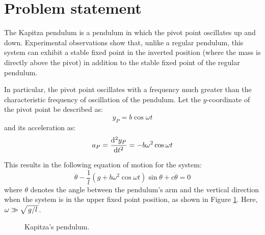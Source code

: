 \section{Problem statement}

The Kapitza pendulum is a pendulum in which the pivot point oscillates up and down. Experimental observations show that, unlike a regular pendulum, this system can exhibit a stable fixed point in the inverted position (where the mass is directly above the pivot) in addition to the stable fixed point of the regular pendulum.

In particular, the pivot point oscillates with a frequency much greater than the characteristic frequency of oscillation of the pendulum. Let the 
$y$-coordinate of the pivot point be described as:
\begin{equation*}
    y_P = b \cos{\omega t}
\end{equation*}
and its acceleration as:
\begin{equation*}
    a_P = \dv[2]{y_P}{t} = -b \omega^2 \cos{\omega t}
\end{equation*}

This results in the following equation of motion for the system:
\begin{equation}
    \ddot{\theta} - \frac{1}{l} \left( g + b \omega^2 \cos{\omega t} \right) \sin{\theta} + c \dot{\theta} = 0
\end{equation}
where $\theta$ denotes the angle between the pendulum's arm and the vertical direction when the system is in the upper fixed point position, as shown in Figure \ref{fig:pendulum}. Here, $\omega \gg \sqrt{\flatfrac{g}{l}}$.

\begin{figure}[h]
    \centering
    \caption{Kapitza's pendulum.}
    \label{fig:pendulum}
\end{figure}


